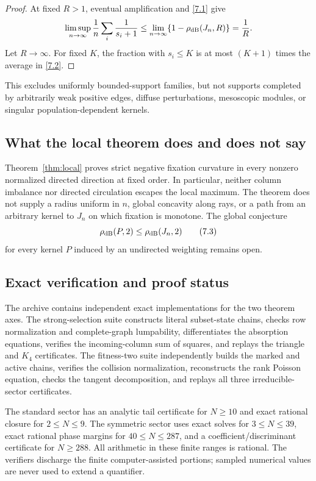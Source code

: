 \begin{proof}
At fixed $R>1$, eventual amplification and \eqref{7.1} give
\[
 \limsup_{n\to\infty}\frac1n\sum_i\frac1{s_i+1}
 \le\lim_{n\to\infty}\{1-\rho_{\mathrm{dB}}(J_n,R)\}=\frac1R.
\]
Let $R\to\infty$.  For fixed $K$, the fraction with $s_i\le K$ is at most
$(K+1)$ times the average in \eqref{7.2}.
\end{proof}

This excludes uniformly bounded-support families, but not supports completed
by arbitrarily weak positive edges, diffuse perturbations, mesoscopic
modules, or singular population-dependent kernels.

\subsection{What the local theorem does and does not say}

Theorem~\ref{thm:local} proves strict negative fixation curvature in every
nonzero normalized directed direction at fixed order.  In particular,
neither column imbalance nor directed circulation escapes the local maximum.
The theorem does not supply a radius uniform in $n$, global concavity along
rays, or a path from an arbitrary kernel to $J_n$ on which fixation is monotone.  The
global conjecture
\[
 \rho_{\mathrm{dB}}(P,2)\le\rho_{\mathrm{dB}}(J_n,2)                         \tag{7.3}\label{7.3}
\]
for every kernel $P$ induced by an undirected weighting remains open.

\subsection{Exact verification and proof status}

The archive contains independent exact implementations for the two theorem
axes.  The strong-selection suite constructs literal subset-state chains,
checks row normalization and complete-graph lumpability, differentiates the
absorption equations, verifies the incoming-column sum of squares, and
replays the triangle and $K_4$ certificates.  The fitness-two suite
independently builds the marked and active chains, verifies the collision
normalization, reconstructs the rank Poisson equation, checks the tangent
decomposition, and replays all three irreducible-sector certificates.

The standard sector has an analytic tail certificate for $N\ge10$ and exact
rational closure for $2\le N\le9$.  The symmetric sector uses exact solves
for $3\le N\le39$, exact rational phase margins for $40\le N\le287$, and a
coefficient/discriminant certificate for $N\ge288$.  All arithmetic in these
finite ranges is rational.  The verifiers discharge the finite
computer-assisted portions; sampled numerical values are never used to
extend a quantifier.

